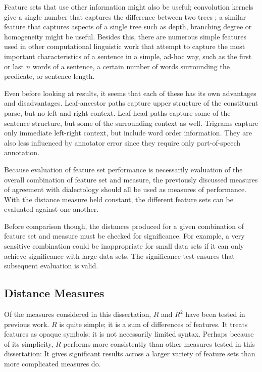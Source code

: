 Feature sets that use other information might also be useful;
convolution kernels give a single number that captures the difference
between two trees \cite{collins01}; a similar feature that captures
aspects of a single tree such as depth, branching degree or
homogeneity might be useful. Besides this, there are numerous simple
features used in other computational linguistic work that attempt to
capture the most important characteristics of a sentence in a simple,
ad-hoc way, such as the first or last $n$ words of a sentence, a
certain number of words surrounding the predicate, or sentence length.

Even before looking at results, it seems that each of these has its
own advantages and disadvantages. Leaf-ancestor paths capture upper
structure of the constituent parse, but no left and right
context. Leaf-head paths capture some of the sentence structure, but
some of the surrounding context as well. Trigrams capture only
immediate left-right context, but include word order information. They
are also less influenced by annotator error since they require only
part-of-speech annotation.

Because evaluation of feature set performance is necessarily evaluation
of the overall combination of feature set and measure, the previously
discussed measures of agreement with dialectology should all be used
as measures of performance. With the distance measure held constant,
the different feature sets can be evaluated against one another.

Before comparison though, the distances produced for a given
combination of feature set and measure must be checked for
significance. For example, a very sensitive combination could be
inappropriate for small data sets if it can only achieve significance
with large data sets. The significance test ensures that subsequent
evaluation is valid.

\subsection{Distance Measures}

Of the measures considered in this dissertation, $R$ and $R^2$ have
been tested in previous work. $R$ is quite simple; it is a sum of
differences of features. It treats features as opaque symbols; it is
not necessarily limited syntax. Perhaps because of its simplicity, $R$
performs more consistently than other measures tested in this
dissertation: It gives significant results across a larger variety of
feature sets than more complicated measures do.

